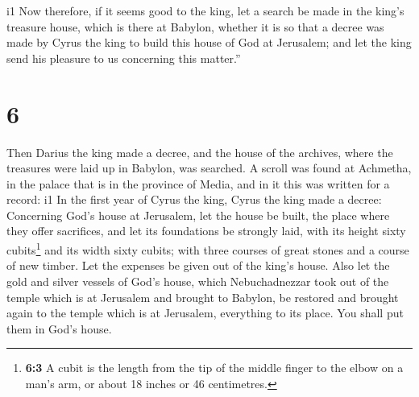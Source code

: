 i1 Now therefore, if it seems good to the king, let a
search be made in the king's treasure house, which is there at Babylon,
whether it is so that a decree was made by Cyrus the king to build this
house of God at Jerusalem; and let the king send his pleasure to us
concerning this matter.''

\hypertarget{section-5}{%
\section{6}\label{section-5}}

 Then Darius the king made a decree, and the house of the
archives, where the treasures were laid up in Babylon, was searched.
 A scroll was found at Achmetha, in the palace that is in
the province of Media, and in it this was written for a record:
i1 In the first year of Cyrus the king, Cyrus the king
made a decree: Concerning God's house at Jerusalem, let the house be
built, the place where they offer sacrifices, and let its foundations be
strongly laid, with its height sixty cubits\footnote{\textbf{6:3} A
  cubit is the length from the tip of the middle finger to the elbow on
  a man's arm, or about 18 inches or 46 centimetres.} and its width
sixty cubits;  with three courses of great stones and a
course of new timber. Let the expenses be given out of the king's house.
 Also let the gold and silver vessels of God's house,
which Nebuchadnezzar took out of the temple which is at Jerusalem and
brought to Babylon, be restored and brought again to the temple which is
at Jerusalem, everything to its place. You shall put them in God's
house.


